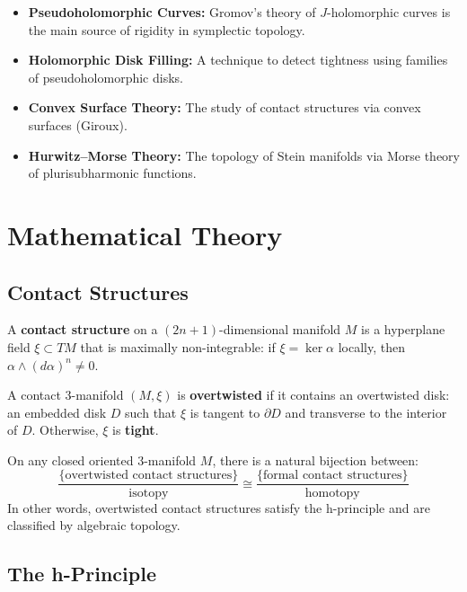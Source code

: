 \begin{itemize}
    \item \textbf{Pseudoholomorphic Curves:} Gromov's theory of $J$-holomorphic curves is the main source of rigidity in symplectic topology.
    \item \textbf{Holomorphic Disk Filling:} A technique to detect tightness using families of pseudoholomorphic disks.
    \item \textbf{Convex Surface Theory:} The study of contact structures via convex surfaces (Giroux).
    \item \textbf{Hurwitz--Morse Theory:} The topology of Stein manifolds via Morse theory of plurisubharmonic functions.
\end{itemize}

\section{Mathematical Theory}

\subsection{Contact Structures}

\begin{definition}
A \textbf{contact structure} on a $(2n+1)$-dimensional manifold $M$ is a hyperplane field $\xi \subset TM$ that is maximally non-integrable: if $\xi = \ker \alpha$ locally, then $\alpha \wedge (d\alpha)^n \neq 0$.
\end{definition}

\begin{definition}
A contact 3-manifold $(M,\xi)$ is \textbf{overtwisted} if it contains an overtwisted disk: an embedded disk $D$ such that $\xi$ is tangent to $\partial D$ and transverse to the interior of $D$. Otherwise, $\xi$ is \textbf{tight}.
\end{definition}

\begin{theorem}[Eliashberg, 1989]
On any closed oriented 3-manifold $M$, there is a natural bijection between:
\[
\frac{\{\text{overtwisted contact structures}\}}{\text{isotopy}} \cong \frac{\{\text{formal contact structures}\}}{\text{homotopy}}
\]
In other words, overtwisted contact structures satisfy the h-principle and are classified by algebraic topology.
\end{theorem}

\subsection{The h-Principle}

